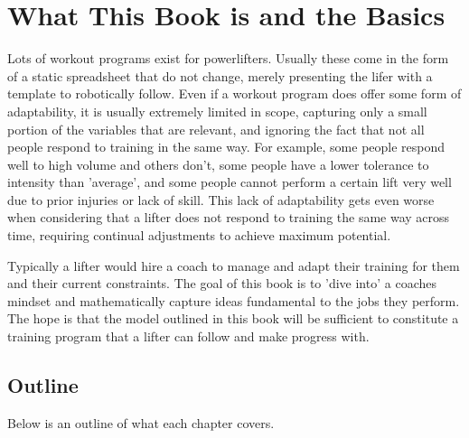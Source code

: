 \chapter{What This Book is and the Basics}

Lots of workout programs exist for powerlifters. Usually these come in the form of a static spreadsheet that do not change, merely presenting the lifer with a template to robotically follow. Even if a workout program does offer some form of adaptability, it is usually extremely limited in scope, capturing only a small portion of the variables that are relevant, and ignoring the fact that not all people respond to training in the same way. For example, some people respond well to high volume and others don't, some people have a lower tolerance to intensity than 'average', and some people cannot perform a certain lift very well due to prior injuries or lack of skill. This lack of adaptability gets even worse when considering that a lifter does not respond to training the same way across time, requiring continual adjustments to achieve maximum potential.

Typically a lifter would hire a coach to manage and adapt their training for them and their current constraints. The goal of this book is to 'dive into' a coaches mindset and mathematically capture ideas fundamental to the jobs they perform. The hope is that the model outlined in this book will be sufficient to constitute a training program that a lifter can follow and make progress with.

\section{Outline}
\label{sec:P1_Outline}

Below is an outline of what each chapter covers.

